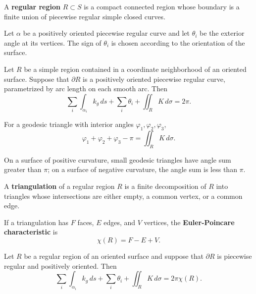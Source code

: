 \documentclass[12pt, oneside]{book}
\begin{document}
\begin{definition}
    A \textbf{regular region} $R\subset S$ is a compact connected region whose
    boundary is a finite union of piecewise regular simple closed curves.
\end{definition}

\begin{definition}
    Let $\alpha$ be a positively oriented piecewise regular curve and let
    $\theta_i$ be the exterior angle at its vertices.  The sign of $\theta_i$ is
    chosen according to the orientation of the surface.
\end{definition}

\begin{theorem}
    Let $R$ be a simple region contained in a coordinate neighborhood of an
    oriented surface.  Suppose that $\partial R$ is a positively oriented
    piecewise regular curve, parametrized by arc length on each smooth arc.
    Then
    \[
        \sum_i\int_{\alpha_i}k_g\,ds+\sum_i\theta_i+\iint_R K\,d\sigma
        =
        2\pi .
    \]
\end{theorem}

\begin{corollary}
    For a geodesic triangle with interior angles $\varphi_1,\varphi_2,\varphi_3$,
    \[
        \varphi_1+\varphi_2+\varphi_3-\pi
        =
        \iint_R K\,d\sigma .
    \]
\end{corollary}

\begin{remark}
    On a surface of positive curvature, small geodesic triangles have angle sum
    greater than $\pi$; on a surface of negative curvature, the angle sum is
    less than $\pi$.
\end{remark}

\begin{definition}
    A \textbf{triangulation} of a regular region $R$ is a finite decomposition
    of $R$ into triangles whose intersections are either empty, a common vertex,
    or a common edge.
\end{definition}

\begin{definition}
    If a triangulation has $F$ faces, $E$ edges, and $V$ vertices, the
    \textbf{Euler-Poincare characteristic} is
    \[
        \chi(R)=F-E+V .
    \]
\end{definition}

\begin{theorem}
    Let $R$ be a regular region of an oriented surface and suppose that
    $\partial R$ is piecewise regular and positively oriented.  Then
    \[
        \sum_i\int_{\alpha_i}k_g\,ds+\sum_i\theta_i+\iint_R K\,d\sigma
        =
        2\pi\chi(R).
    \]
\end{theorem}
\end{document}
